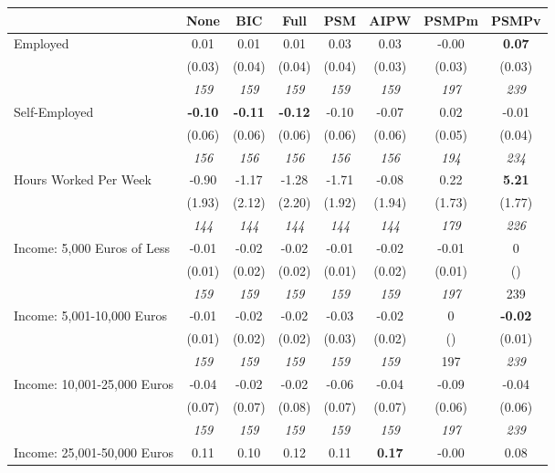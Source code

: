\begin{tabular}{l c c c c c c c}
\toprule
 & None & BIC & Full & PSM & AIPW & PSMPm & PSMPv \\
\midrule
Employed & 0.01 & 0.01 & 0.01 & 0.03 & 0.03 & -0.00 & \textbf{0.07} \\
& (0.03) & (0.04) & (0.04) & (0.04) & (0.03) & (0.03) & (0.03) \\
& \textit{ 159 } & \textit{ 159 } & \textit{ 159 } & \textit{ 159 } & \textit{ 159 } & \textit{ 197 } & \textit{ 239 } \\
Self-Employed & \textbf{ -0.10 } & \textbf{ -0.11 } & \textbf{ -0.12 } & -0.10 & -0.07 & 0.02 & -0.01 \\
& (0.06) & (0.06) & (0.06) & (0.06) & (0.06) & (0.05) & (0.04) \\
& \textit{ 156 } & \textit{ 156 } & \textit{ 156 } & \textit{ 156 } & \textit{ 156 } & \textit{ 194 } & \textit{ 234 } \\
Hours Worked Per Week & -0.90 & -1.17 & -1.28 & -1.71 & -0.08 & 0.22 & \textbf{5.21} \\
& (1.93) & (2.12) & (2.20) & (1.92) & (1.94) & (1.73) & (1.77) \\
& \textit{ 144 } & \textit{ 144 } & \textit{ 144 } & \textit{ 144 } & \textit{ 144 } & \textit{ 179 } & \textit{ 226 } \\
Income: 5,000 Euros of Less & -0.01 & -0.02 & -0.02 & -0.01 & -0.02 & -0.01 & 0 \\
& (0.01) & (0.02) & (0.02) & (0.01) & (0.02) & (0.01) & () \\
& \textit{ 159 } & \textit{ 159 } & \textit{ 159 } & \textit{ 159 } & \textit{ 159 } & \textit{ 197 } & 239 \\
Income: 5,001-10,000 Euros & -0.01 & -0.02 & -0.02 & -0.03 & -0.02 & 0 & \textbf{-0.02} \\
& (0.01) & (0.02) & (0.02) & (0.03) & (0.02) & () & (0.01) \\
& \textit{ 159 } & \textit{ 159 } & \textit{ 159 } & \textit{ 159 } & \textit{ 159 } & 197 & \textit{ 239 } \\
Income: 10,001-25,000 Euros & -0.04 & -0.02 & -0.02 & -0.06 & -0.04 & -0.09 & -0.04 \\
& (0.07) & (0.07) & (0.08) & (0.07) & (0.07) & (0.06) & (0.06) \\
& \textit{ 159 } & \textit{ 159 } & \textit{ 159 } & \textit{ 159 } & \textit{ 159 } & \textit{ 197 } & \textit{ 239 } \\
Income: 25,001-50,000 Euros & 0.11 & 0.10 & 0.12 & 0.11 & \textbf{0.17} & -0.00 & 0.08 \\

\end{tabular}
